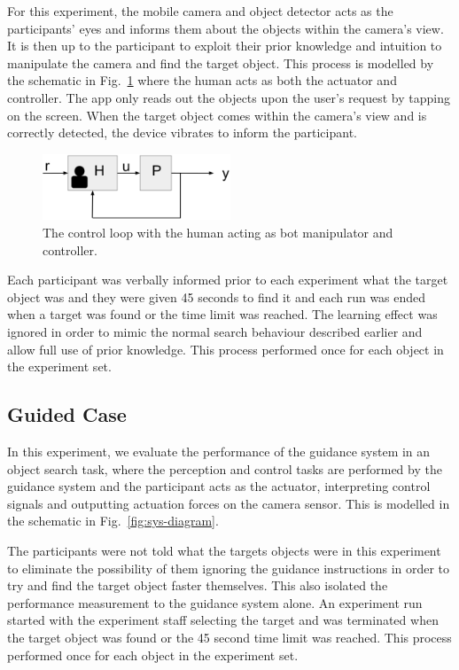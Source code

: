 \documentclass[runningheads]{llncs}
\begin{document}
For this experiment, the mobile camera and object detector acts as the participants' eyes and informs them about the objects within the camera's view.
It is then up to the participant to exploit their prior knowledge and intuition to manipulate the camera and find the target object. 
This process is modelled by the schematic in Fig.~\ref{fig:sys-diagram-no-controller} where the human acts as both the actuator and controller.
The app only reads out the objects upon the user's request by tapping on the screen. 
When the target object comes within the camera's view and is correctly detected, the device vibrates to inform the participant. 

\begin{figure}
  \centering
  \includegraphics[width=0.5\textwidth]{figures/control_loop_no_controller.png}
  \caption{The control loop with the human acting as bot manipulator and controller. }\label{fig:sys-diagram-no-controller}
\end{figure}

Each participant was verbally informed prior to each experiment what the target object was and they were given 45 seconds to find it and each run was ended when a target was found or the time limit was reached. 
The learning effect was ignored in order to mimic the normal search behaviour described earlier and allow full use of prior knowledge. 
This process performed once for each object in the experiment set. 

\subsection{Guided Case}

In this experiment, we evaluate the performance of the guidance system in an object search task, where the perception and control tasks are performed by the guidance system and the participant acts as the actuator, interpreting control signals and outputting actuation forces on the camera sensor. 
This is modelled in the schematic in Fig.~\ref{fig:sys-diagram}. 

The participants were not told what the targets objects were in this experiment to eliminate the possibility of them ignoring the guidance instructions in order to try and find the target object faster themselves.
This also isolated the performance measurement to the guidance system alone.
An experiment run started with the experiment staff selecting the target and was terminated when the target object was found or the 45 second time limit was reached.
This process performed once for each object in the experiment set. 
\end{document}
